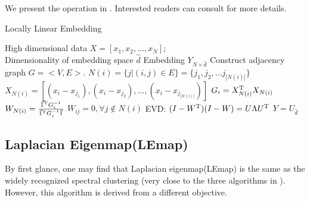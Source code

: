 We present the operation in \ralg{\ref{alg:lle}}. 
Interested readers can consult \cite{saul2003think} 
for more details. 

\begin{algorithm}[htb]
	\caption{Locally Linear Embedding}
	\label{alg:lle}
	\begin{algorithmic}[1]
		\REQUIRE High dimensional data $X = [x_1, x_2, \ldots, x_N]$; \\
			Dimensionality of embedding space $ \hat{d} $
		\ENSURE Embedding $ Y_{N \times \hat{d}} $
		\STATE Construct adjacency graph $ G = <V, E> $.		
			\STATE $ N(i) = \{j | (i,j) \in E\} = \{ j_1,j_2, \ldots j_{|N(i)|}\} $
			\STATE $ X_{N(i)} =
			[(x_i - x_{j_1}), (x_i - x_{j_2}), \ldots, (x_i - x_{j_{|N(i)|}}) ] $
			\STATE $ G_i = X_{N(i)} ^\mathrm{T} X_{N(i)} $
			\STATE $ W_{N(i)} = \frac{\vec{1}^\mathrm{T} G_i^{-1}}{\vec{1}^\mathrm{T} G_i^{-1} \vec{1}} $
			\STATE $ W_{ij} = 0, \forall j \notin N(i) $
		\ENDFOR
		\STATE EVD: $ (I - W^\mathrm{T})(I - W) = U \Lambda U^\mathrm{T} $
		\STATE $ Y = U_{\hat{d}} $
	\end{algorithmic}
\end{algorithm}

\subsection{Laplacian Eigenmap(LEmap)}
\label{sec:lemap}

By first glance, one may find that 
Laplacian eigenmap(LEmap)\cite{belkin2003laplacian}
is the same as the widely recognized
spectral clustering (very close to the three
algorithms in \cite{von2007tutorial}). 
However, this algorithm is derived from a 
different objective. 

